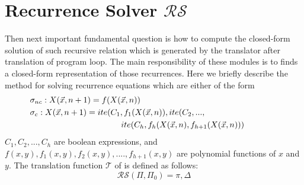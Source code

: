 \documentclass{article}
\begin{document}
\section{Recurrence Solver $\mathcal{RS}$}\label{recurrence}
Then next important fundamental question is how to compute the closed-form solution of such recursive relation which is generated by the translator after translation of program loop. The main responsibility of these modules is to finds a closed-form representation of those recurrences. Here we briefly describe the method for solving recurrence equations which are either of  the form
\begin{align}
    &\hspace*{-4em}\sigma_{nc} : X(\vec{x},n+1)= f(X(\vec{x},n))\label{rec_eq1}\\
    &\hspace*{-4em}\sigma_{c} : X(\vec{x},n+1)= ite(C_1,f_1(X(\vec{x},n)),ite(C_2,...,\nonumber\\
    &\hspace*{7em}ite(C_h,f_{h}(X(\vec{x},n),f_{h+1}(X(\vec{x},n)))\label{rec_eq2}
\end{align}
$C_1,C_2,...,C_{h}$ are boolean expressions, and 
$f(x,y),f_1(x,y),f_2(x,y),....,f_{h+1}(x,y)$ are polynomial functions of $x$ and $y$.
The translation function $\mathcal{T}$ of is defined  as follows:
\[\mathcal{RS}(\Pi,\Pi_{0})=\pi,\Delta\]
\end{document}

